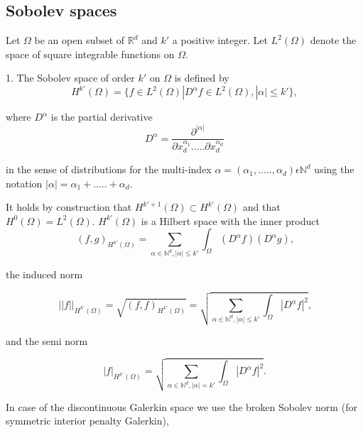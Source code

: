 \documentclass[a4paper,twoside,openright]{book}
\begin{document}
\begin{appendices}
\subsection{Sobolev spaces} 

Let $\Omega$ be an open subset of $\mathbb{R}^d$ and $k'$ a positive integer. Let $L^2(\Omega)$ denote the space of square integrable functions on $\Omega$. 

1. The Sobolev space of order $k'$ on $\Omega$ is defined by\\
\begin{equation}
H^{k'} (\Omega) = \lbrace f \in L^2 (\Omega) | D^\alpha f \in L^2 (\Omega), |\alpha| \leq k' \rbrace ,
\end{equation} 

where $D^\alpha$ is the partial derivative
\begin{equation}
D^\alpha = \frac{\partial^{|\alpha|}}{\partial x_d^{\alpha_1} ..... \partial x_d^{\alpha_d}}
\end{equation}

in the sense of distributions for the multi-index $\alpha = (\alpha_1,.....,\alpha_d) \epsilon \mathbb{N}^d$ using the notation $|\alpha| = \alpha_1 + ..... + \alpha_d $.

It holds by construction that $H^{k'+1}(\Omega) \subset H^{k'} (\Omega)$ and that $H^0 (\Omega) = L^2 (\Omega)$. $H^{k'}(\Omega)$ is a Hilbert space with the inner product
\begin{equation}
(f,g)_{H^{k'}(\Omega)} = \sum_{\alpha \in \mathbb{N}^d, |\alpha| \leq k'} \int_\Omega (D^\alpha f) (D^\alpha g) \textrm{,}
\end{equation}

the induced norm 

\begin{equation}
||f||_{H^{k'} (\Omega)} = \sqrt{(f,f)_{H^{k'}(\Omega)}} = \sqrt{\sum_{\alpha \in \mathbb{N}^d, |\alpha| \leq k'} \int_\Omega |D^\alpha f|^2} \textrm{,}
\end{equation}

and the semi norm 

\begin{equation}
|f|_{H^{k'} (\Omega)} = \sqrt{\sum_{\alpha \in \mathbb{N}^d, |\alpha| = k'} \int_\Omega |D^\alpha f|^2} \textrm{.}
\end{equation}

In case of the discontinuous Galerkin space we use the broken Sobolev norm (for symmetric interior penalty Galerkin), \cite{Montlaur2}


\end{appendices}
\end{document}
